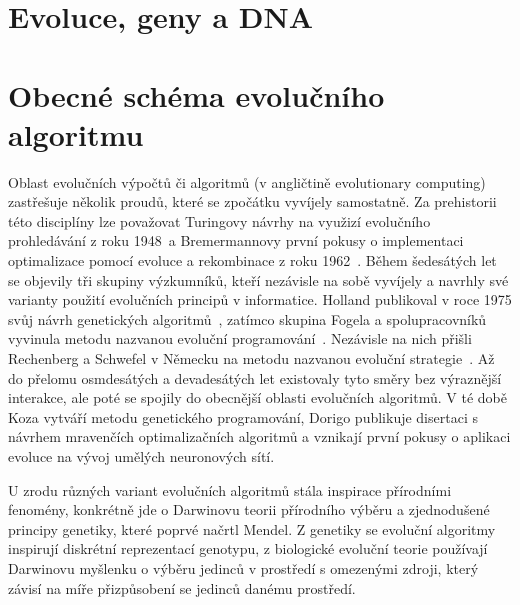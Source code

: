 
\section{Evoluce, geny a DNA}


\section{Obecné schéma evolučního algoritmu}

Oblast evolučních výpočtů či algoritmů (v angličtině evolutionary computing) zastřešuje několik proudů, které se zpočátku vyvíjely samostatně. Za prehistorii této disciplíny lze považovat Turingovy návrhy na využizí evolučního prohledávání z roku 1948~\cite{Turing:1948}\missingref a Bremermannovy první pokusy o implementaci optimalizace pomocí evoluce a rekombinace z roku 1962~\cite{Bremermann:1962}\missingref. Během šedesátých let se objevily tři skupiny výzkumníků, kteří nezávisle na sobě vyvíjely a navrhly své varianty použití evolučních principů v informatice. Holland publikoval v roce 1975 svůj návrh genetických algoritmů~\cite{Holland:1992}, 
zatímco skupina Fogela a spolupracovníků vyvinula metodu nazvanou evoluční programování~\cite{Fogel:1995}. 
Nezávisle na nich přišli Rechenberg a Schwefel v Německu na metodu nazvanou evoluční strategie~\cite{Beyer:2002}.
Až do přelomu osmdesátých a devadesátých let existovaly tyto směry bez výraznější interakce, ale poté se spojily do obecnější oblasti evolučních algoritmů. V té době  Koza vytváří metodu genetického programování, Dorigo publikuje disertaci s návrhem mravenčích optimalizačních algoritmů a vznikají první pokusy o aplikaci evoluce na vývoj umělých neuronových sítí. 

U zrodu různých variant evolučních algoritmů stála inspirace přírodními fenomény, konkrétně jde o Darwinovu teorii přírodního výběru a zjednodušené principy genetiky, které poprvé načrtl Mendel. Z genetiky se evoluční algoritmy inspirují diskrétní reprezentací genotypu, z biologické evoluční teorie používají Darwinovu myšlenku o výběru jedinců v prostředí s omezenými zdroji, který závisí na míře přizpůsobení se jedinců danému prostředí.

